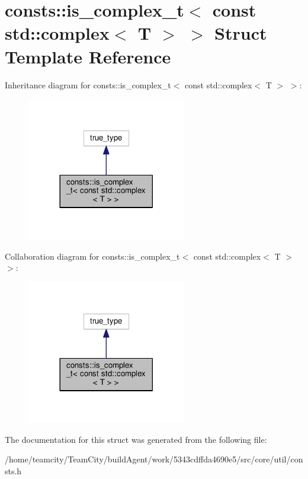 \hypertarget{structconsts_1_1is__complex__t_3_01const_01std_1_1complex_3_01T_01_4_01_4}{}\section{consts\+:\+:is\+\_\+complex\+\_\+t$<$ const std\+:\+:complex$<$ T $>$ $>$ Struct Template Reference}
\label{structconsts_1_1is__complex__t_3_01const_01std_1_1complex_3_01T_01_4_01_4}


Inheritance diagram for consts\+:\+:is\+\_\+complex\+\_\+t$<$ const std\+:\+:complex$<$ T $>$ $>$\+:\nopagebreak
\begin{figure}[H]
\begin{center}
\leavevmode
\includegraphics[width=197pt]{structconsts_1_1is__complex__t_3_01const_01std_1_1complex_3_01T_01_4_01_4__inherit__graph}
\end{center}
\end{figure}


Collaboration diagram for consts\+:\+:is\+\_\+complex\+\_\+t$<$ const std\+:\+:complex$<$ T $>$ $>$\+:\nopagebreak
\begin{figure}[H]
\begin{center}
\leavevmode
\includegraphics[width=197pt]{structconsts_1_1is__complex__t_3_01const_01std_1_1complex_3_01T_01_4_01_4__coll__graph}
\end{center}
\end{figure}


The documentation for this struct was generated from the following file\+:\begin{DoxyCompactItemize}
\item 
/home/teamcity/\+Team\+City/build\+Agent/work/5343cdffda4690e5/src/core/util/consts.\+h\end{DoxyCompactItemize}
